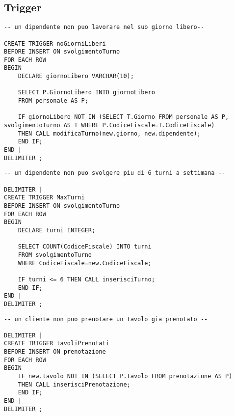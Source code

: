 \subsection{Trigger} %
\begin{lstlisting}[title=Regola di vincolo 1, style=mysqlStyle]
-- un dipendente non puo lavorare nel suo giorno libero--

CREATE TRIGGER noGiorniLiberi
BEFORE INSERT ON svolgimentoTurno
FOR EACH ROW
BEGIN
    DECLARE giornoLibero VARCHAR(10);
    
    SELECT P.GiornoLibero INTO giornoLibero
    FROM personale AS P;
    
    IF giornoLibero NOT IN (SELECT T.Giorno FROM personale AS P, svolgimentoTurno AS T WHERE P.CodiceFiscale=T.CodiceFiscale)
    THEN CALL modificaTurno(new.giorno, new.dipendente);
    END IF;
END |
DELIMITER ;
\end{lstlisting}

\begin{lstlisting}[title=Regola di vincolo 2, style=mysqlStyle]
-- un dipendente non puo svolgere piu di 6 turni a settimana --

DELIMITER |
CREATE TRIGGER MaxTurni
BEFORE INSERT ON svolgimentoTurno
FOR EACH ROW
BEGIN
    DECLARE turni INTEGER;
    
    SELECT COUNT(CodiceFiscale) INTO turni
    FROM svolgimentoTurno
    WHERE CodiceFiscale=new.CodiceFiscale;
    
    IF turni <= 6 THEN CALL inserisciTurno;
    END IF;
END |
DELIMITER ;
\end{lstlisting}
\begin{lstlisting}[title=Regola di vincolo 3, style=mysqlStyle]
-- un cliente non puo prenotare un tavolo gia prenotato --

DELIMITER |
CREATE TRIGGER tavoliPrenotati
BEFORE INSERT ON prenotazione
FOR EACH ROW
BEGIN
    IF new.tavolo NOT IN (SELECT P.tavolo FROM prenotazione AS P)
    THEN CALL inserisciPrenotazione;
    END IF;
END |
DELIMITER ;
\end{lstlisting}
